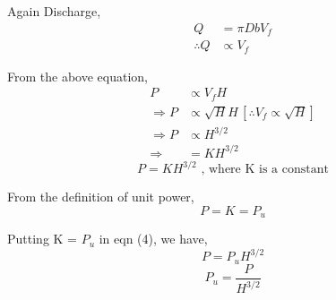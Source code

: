 \documentclass{article}
\begin{document}
\begin{multicols}{2}
        Again Discharge,
        \begin{align*}
          Q &=  \pi D b V_f \\
          \therefore Q & \propto V_f
        \end{align*}

        From the above equation,
        \begin{align*}
          P &\propto V_f H \\
          \Rightarrow P &\propto \sqrt{H} H \, [\therefore V_f \propto \sqrt{H}] \\
          \Rightarrow P &\propto H^{3/2} \\
          \Rightarrow &= K H^{3/2} 
        \end{align*}
        \begin{equation}
          P = KH^{3/2} \text{ , where K is a constant} 
        \end{equation}

        From the definition of unit power,
        $$P = K = P_u$$

        Putting K = $P_u$ in eqn (4), we have,
        $$P = P_u H^{3/2}$$
        $$P_u = \frac{P}{H^{3/2}}$$
      \end{multicols}
      \hrulefill 
\end{document}
